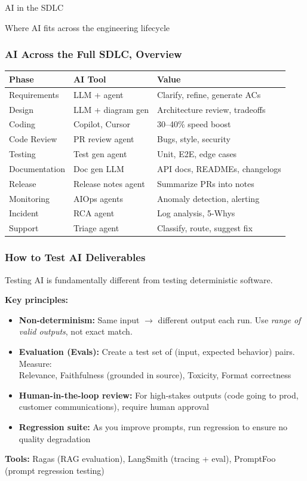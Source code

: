 \begin{frame}[fragile]\frametitle{}
\begin{center}
{\Large AI in the SDLC}

{\small Where AI fits across the engineering lifecycle}
\end{center}
\end{frame}

\begin{frame}[fragile]\frametitle{AI Across the Full SDLC, Overview}
\begin{center}
\begin{tabular}{|p{1.2cm}|p{2cm}|p{3cm}|}
\hline
\textbf{Phase} & \textbf{AI Tool} & \textbf{Value} \\
\hline
Requirements & LLM + agent & Clarify, refine, generate ACs \\
Design & LLM + diagram gen & Architecture review, tradeoffs \\
Coding & Copilot, Cursor & 30--40\% speed boost \\
Code Review & PR review agent & Bugs, style, security \\
Testing & Test gen agent & Unit, E2E, edge cases \\
Documentation & Doc gen LLM & API docs, READMEs, changelogs \\
Release & Release notes agent & Summarize PRs into notes \\
Monitoring & AIOps agents & Anomaly detection, alerting \\
Incident & RCA agent & Log analysis, 5-Whys \\
Support & Triage agent & Classify, route, suggest fix \\
\hline
\end{tabular}
\end{center}
\end{frame}

\begin{frame}[fragile]\frametitle{How to Test AI Deliverables}
Testing AI is fundamentally different from testing deterministic software.

\textbf{Key principles:}
\begin{itemize}
\item \textbf{Non-determinism:} Same input $\rightarrow$ different output each run. Use \textit{range of valid outputs}, not exact match.
\item \textbf{Evaluation (Evals):} Create a test set of (input, expected behavior) pairs. Measure:\\
  Relevance, Faithfulness (grounded in source), Toxicity, Format correctness
\item \textbf{Human-in-the-loop review:} For high-stakes outputs (code going to prod, customer communications), require human approval
\item \textbf{Regression suite:} As you improve prompts, run regression to ensure no quality degradation
\end{itemize}

\textbf{Tools:} Ragas (RAG evaluation), LangSmith (tracing + eval), PromptFoo (prompt regression testing)
\end{frame}

